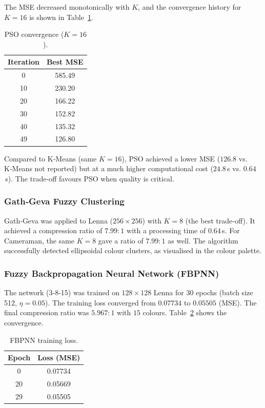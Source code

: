 The MSE decreased monotonically with $K$, and the convergence history for $K=16$ is shown in Table~\ref{tab:pso_convergence}.

\begin{table}[H]
\centering
\caption{PSO convergence ($K=16$).}
\label{tab:pso_convergence}
\begin{tabular}{c c}
\hline
\textbf{Iteration} & \textbf{Best MSE} \\
\hline
0   & 585.49 \\
10  & 230.20 \\
20  & 166.22 \\
30  & 152.82 \\
40  & 135.32 \\
49  & 126.80 \\
\hline
\end{tabular}
\end{table}

Compared to K‑Means (same $K=16$), PSO achieved a lower MSE ($126.8$ vs. K‑Means not reported) but at a much higher computational cost ($24.8$ s vs. $0.64$ s). The trade‑off favours PSO when quality is critical.

\subsubsection{Gath‑Geva Fuzzy Clustering}
Gath‑Geva was applied to Lenna ($256\times256$) with $K=8$ (the best trade‑off). It achieved a compression ratio of $7.99:1$ with a processing time of $0.64$ s. For Cameraman, the same $K=8$ gave a ratio of $7.99:1$ as well. The algorithm successfully detected ellipsoidal colour clusters, as visualised in the colour palette.

\subsubsection{Fuzzy Backpropagation Neural Network (FBPNN)}
The network (3‑8‑15) was trained on $128\times128$ Lenna for 30 epochs (batch size 512, $\eta=0.05$). The training loss converged from $0.07734$ to $0.05505$ (MSE). The final compression ratio was $5.967:1$ with $15$ colours. Table~\ref{tab:fbpnn_loss} shows the convergence.

\begin{table}[H]
\centering
\caption{FBPNN training loss.}
\label{tab:fbpnn_loss}
\begin{tabular}{c c}
\hline
\textbf{Epoch} & \textbf{Loss (MSE)} \\
\hline
0  & 0.07734 \\
20 & 0.05669 \\
29 & 0.05505 \\
\hline
\end{tabular}
\end{table}

